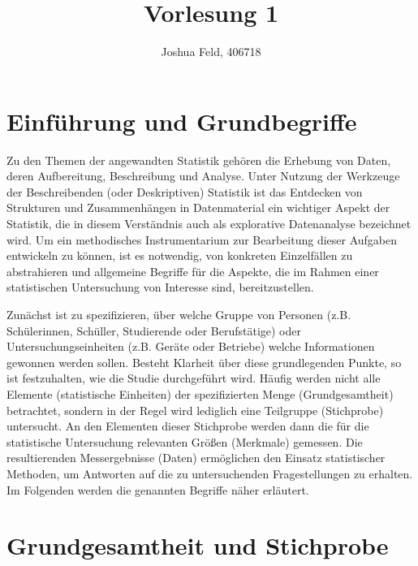 \documentclass{lecture}
\institute{Institut für Statistik und Wirtschaftsmathematik}
\title{Vorlesung 1}
\author{Joshua Feld, 406718}
\begin{document}
    \maketitle


    \section*{Einführung und Grundbegriffe}

    Zu den Themen der angewandten Statistik gehören die Erhebung von Daten, deren Aufbereitung, Beschreibung und Analyse.
    Unter Nutzung der Werkzeuge der Beschreibenden (oder Deskriptiven) Statistik ist das Entdecken von Strukturen und Zusammenhängen in Datenmaterial ein wichtiger Aspekt der Statistik, die in diesem Verständnis auch als explorative Datenanalyse bezeichnet wird.
    Um ein methodisches Instrumentarium zur Bearbeitung dieser Aufgaben entwickeln zu können, ist es notwendig, von konkreten Einzelfällen zu abstrahieren und allgemeine Begriffe für die Aspekte, die im Rahmen einer statistischen Untersuchung von Interesse sind, bereitzustellen.

    Zunächst ist zu spezifizieren, über welche Gruppe von Personen (z.B. Schülerinnen, Schüller, Studierende oder Berufstätige) oder Untersuchungseinheiten (z.B. Geräte oder Betriebe) welche Informationen gewonnen werden sollen.
    Besteht Klarheit über diese grundlegenden Punkte, so ist festzuhalten, wie die Studie durchgeführt wird.
    Häufig werden nicht alle Elemente (statistische Einheiten) der spezifizierten Menge (Grundgesamtheit) betrachtet, sondern in der Regel wird lediglich eine Teilgruppe (Stichprobe) untersucht.
    An den Elementen dieser Stichprobe werden dann die für die statistische Untersuchung relevanten Größen (Merkmale) gemessen.
    Die resultierenden Messergebnisse (Daten) ermöglichen den Einsatz statistischer Methoden, um Antworten auf die zu untersuchenden Fragestellungen zu erhalten.
    Im Folgenden werden die genannten Begriffe näher erläutert.

    \section*{Grundgesamtheit und Stichprobe}
\end{document}
